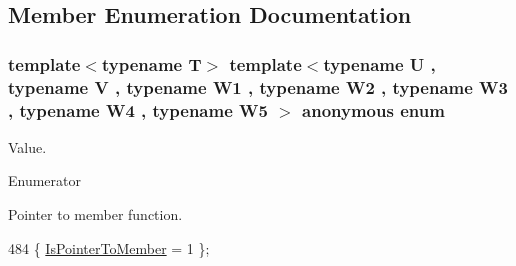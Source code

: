 \subsection{Member Enumeration Documentation}
\subsubsection[{\texorpdfstring{anonymous enum}{anonymous enum}}]{\setlength{\rightskip}{0pt plus 5cm}template$<$typename T$>$ template$<$typename U , typename V , typename W1 , typename W2 , typename W3 , typename W4 , typename W5 $>$ anonymous enum}\hypertarget{structTypeTraits_1_1PtrToMemberTraits_3_01U_07V_1_1_5_08_07W1_00_01W2_00_01W3_00_01W4_00_01W5_08_4_a1774a75ee65d4a22e4a76f6b80904ff1}{}\label{structTypeTraits_1_1PtrToMemberTraits_3_01U_07V_1_1_5_08_07W1_00_01W2_00_01W3_00_01W4_00_01W5_08_4_a1774a75ee65d4a22e4a76f6b80904ff1}
Value. \begin{Desc}
\item[Enumerator]\par
\begin{description}
\item[{\em 
Is\+Pointer\+To\+Member\hypertarget{structTypeTraits_1_1PtrToMemberTraits_3_01U_07V_1_1_5_08_07W1_00_01W2_00_01W3_00_01W4_00_01W5_08_4_a1774a75ee65d4a22e4a76f6b80904ff1a335f06acb7c1520df8380fca16d2d220}{}\label{structTypeTraits_1_1PtrToMemberTraits_3_01U_07V_1_1_5_08_07W1_00_01W2_00_01W3_00_01W4_00_01W5_08_4_a1774a75ee65d4a22e4a76f6b80904ff1a335f06acb7c1520df8380fca16d2d220}
}]Pointer to member function. \end{description}
\end{Desc}

\begin{DoxyCode}
484 \{ \hyperlink{structTypeTraits_1_1PtrToMemberTraits_3_01U_07V_1_1_5_08_07W1_00_01W2_00_01W3_00_01W4_00_01W5_08_4_a1774a75ee65d4a22e4a76f6b80904ff1a335f06acb7c1520df8380fca16d2d220}{IsPointerToMember} = 1    \};
\end{DoxyCode}
